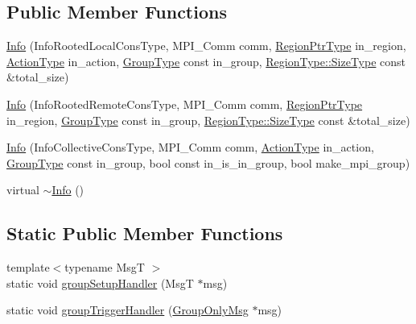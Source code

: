 \subsection*{Public Member Functions}
\begin{DoxyCompactItemize}
\item 
\hyperlink{structvt_1_1group_1_1_info_afe28218871a3b83a304bff5e72055eae}{Info} (Info\+Rooted\+Local\+Cons\+Type, M\+P\+I\+\_\+\+Comm comm, \hyperlink{structvt_1_1group_1_1_info_rooted_a127ac5ebcfb9871621c1f66dba481c0b}{Region\+Ptr\+Type} in\+\_\+region, \hyperlink{namespacevt_ae0a5a7b18cc99d7b732cb4d44f46b0f3}{Action\+Type} in\+\_\+action, \hyperlink{namespacevt_a27b5e4411c9b6140c49100e050e2f743}{Group\+Type} const in\+\_\+group, \hyperlink{structvt_1_1group_1_1region_1_1_region_a9bb381adf31111aae34dbc644bad6c1f}{Region\+Type\+::\+Size\+Type} const \&total\+\_\+size)
\item 
\hyperlink{structvt_1_1group_1_1_info_aadcf55179338b7921de5c1a6856a1d42}{Info} (Info\+Rooted\+Remote\+Cons\+Type, M\+P\+I\+\_\+\+Comm comm, \hyperlink{structvt_1_1group_1_1_info_rooted_a127ac5ebcfb9871621c1f66dba481c0b}{Region\+Ptr\+Type} in\+\_\+region, \hyperlink{namespacevt_a27b5e4411c9b6140c49100e050e2f743}{Group\+Type} const in\+\_\+group, \hyperlink{structvt_1_1group_1_1region_1_1_region_a9bb381adf31111aae34dbc644bad6c1f}{Region\+Type\+::\+Size\+Type} const \&total\+\_\+size)
\item 
\hyperlink{structvt_1_1group_1_1_info_a76c4cf6ec9e88e8f79aa0fe90af82289}{Info} (Info\+Collective\+Cons\+Type, M\+P\+I\+\_\+\+Comm comm, \hyperlink{namespacevt_ae0a5a7b18cc99d7b732cb4d44f46b0f3}{Action\+Type} in\+\_\+action, \hyperlink{namespacevt_a27b5e4411c9b6140c49100e050e2f743}{Group\+Type} const in\+\_\+group, bool const in\+\_\+is\+\_\+in\+\_\+group, bool make\+\_\+mpi\+\_\+group)
\item 
virtual \hyperlink{structvt_1_1group_1_1_info_a04f1febedc844247ef36c17146f5ccfc}{$\sim$\+Info} ()
\end{DoxyCompactItemize}
\subsection*{Static Public Member Functions}
\begin{DoxyCompactItemize}
\item 
{\footnotesize template$<$typename MsgT $>$ }\\static void \hyperlink{structvt_1_1group_1_1_info_a8479ae53fed60033acca267e0918aa6f}{group\+Setup\+Handler} (MsgT $\ast$msg)
\item 
static void \hyperlink{structvt_1_1group_1_1_info_a4b457782f9b23a2ad6df129d6c4b1502}{group\+Trigger\+Handler} (\hyperlink{namespacevt_1_1group_a864fcf6bc821eacf8350bf4ad15e51b3}{Group\+Only\+Msg} $\ast$msg)
\end{DoxyCompactItemize}
